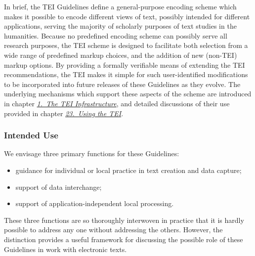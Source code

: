In brief, the TEI Guidelines define a general-purpose encoding scheme which makes it possible to encode different views of text, possibly intended for different applications, serving the majority of scholarly purposes of text studies in the humanities. Because no predefined encoding scheme can possibly serve all research purposes, the TEI scheme is designed to facilitate both selection from a wide range of predefined markup choices, and the addition of new (non-TEI) markup options. By providing a formally verifiable means of extending the TEI recommendations, the TEI makes it simple for such user-identified modifications to be incorporated into future releases of these Guidelines as they evolve. The underlying mechanisms which support these aspects of the scheme are introduced in chapter \textit{\hyperref[ST]{1.\ The TEI Infrastructure}}, and detailed discussions of their use provided in chapter \textit{\hyperref[USE]{23.\ Using the TEI}}.
\subsubsection[{Intended Use}]{Intended Use}\label{ABAPP}\par
We envisage three primary functions for these Guidelines: \begin{itemize}
\item guidance for individual or local practice in text creation and data capture;
\item support of data interchange;
\item support of application-independent local processing.
\end{itemize}  These three functions are so thoroughly interwoven in practice that it is hardly possible to address any one without addressing the others. However, the distinction provides a useful framework for discussing the possible role of these Guidelines in work with electronic texts.
